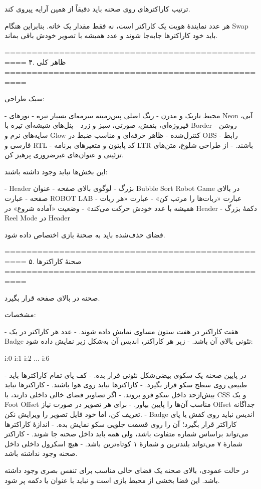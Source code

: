 ترتیب کاراکترهای روی صحنه باید دقیقاً از همین آرایه پیروی کند.

هر عدد نمایندهٔ هویت یک کاراکتر است، نه فقط مقدار یک خانه. بنابراین هنگام Swap باید خود کاراکترها جابه‌جا شوند و عدد همیشه با تصویر خودش باقی بماند.

==================================================
۴. ظاهر کلی
==================================================

سبک طراحی:

- محیط تاریک و مدرن
- رنگ اصلی پس‌زمینه سرمه‌ای بسیار تیره
- نورهای Neon آبی، فیروزه‌ای، بنفش، صورتی، سبز و زرد
- پنل‌های شیشه‌ای تیره با Border روشن
- سایه‌های نرم و Glow کنترل‌شده
- ظاهر حرفه‌ای و مناسب ضبط در OBS
- رابط فارسی و RTL
- کد پایتون و متغیرهای برنامه LTR باشند.
- از طراحی شلوغ، متن‌های تزئینی و عنوان‌های غیرضروری پرهیز کن.

این بخش‌ها نباید وجود داشته باشند:

- Header بزرگ
- لوگوی بالای صفحه
- عنوان Bubble Sort Robot Game در بالای صفحه
- عبارت ROBOT LAB
- عبارت «ربات‌ها را مرتب کن»
- عبارت «هر ربات همیشه با عدد خودش حرکت می‌کند»
- وضعیت «آماده شروع» در Header
- دکمهٔ بزرگ Reel Mode در Header

فضای حذف‌شده باید به صحنهٔ بازی اختصاص داده شود.

==================================================
۵. صحنهٔ کاراکترها
==================================================

صحنه در بالای صفحه قرار بگیرد.

مشخصات:

- هفت کاراکتر در هفت ستون مساوی نمایش داده شوند.
- عدد هر کاراکتر در یک Badge نئونی بالای آن باشد.
- زیر هر کاراکتر، اندیس آن به‌شکل زیر نمایش داده شود:

i:0
i:1
i:2
...
i:6

- در پایین صحنه یک سکوی بیضی‌شکل نئونی قرار بده.
- کف پای تمام کاراکترها باید طبیعی روی سطح سکو قرار بگیرد.
- کاراکترها نباید روی هوا باشند.
- کاراکترها نباید بیش‌ازحد داخل سکو فرو بروند.
- اگر تصاویر فضای خالی داخلی دارند، با CSS و یک Foot Offset مناسب آن‌ها را پایین بیاور.
- برای هر تصویر در صورت نیاز Offset جداگانه تعریف کن، اما خود فایل تصویر را ویرایش نکن.
- Badge اندیس نباید روی کفش یا پای کاراکتر قرار بگیرد؛ آن را روی قسمت جلویی سکو نمایش بده.
- اندازهٔ کاراکترها می‌تواند براساس شماره متفاوت باشد، ولی همه باید داخل صحنه جا شوند.
- کاراکتر شمارهٔ ۷ می‌تواند بلندترین و شمارهٔ ۱ کوتاه‌ترین باشد.
- هیچ اسکرول داخلی داخل صحنه وجود نداشته باشد.

در حالت عمودی، بالای صحنه یک فضای خالی مناسب برای تنفس بصری وجود داشته باشد. این فضا بخشی از محیط بازی است و نباید با عنوان یا دکمه پر شود.


